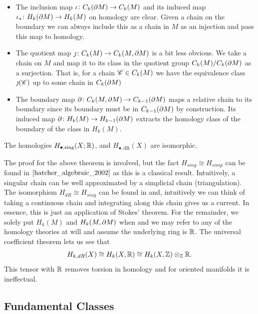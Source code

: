 \documentclass{article}
\begin{document}
\begin{itemize}
    \item The inclusion map $\iota \colon C_k({\partial M}) \to C_k(M)$ and its induced map $\iota_* \colon H_k({\partial M}) \to H_k(M)$ on homology are clear. Given a chain on the boundary we can always include this as a chain in $M$ as an injection and pass this map to homology.
    \item The quotient map $\jmath \colon C_k(M) \to C_k(M,{\partial M})$ is a bit less obvious. We take a chain on $M$ and map it to its class in the quotient group $C_k(M)/C_k({\partial M})$ as a surjection. That is, for a chain $\mathscr{C} \in C_k(M)$ we have the equivalence class $\jmath (\mathscr{C})$ up to some chain in $C_k({\partial M})$
    \item The boundary map $\partial \colon C_k(M,{\partial M}) \to C_{k-1}({\partial M})$ maps a relative chain to its boundary since its boundary must be in $C_{k-1}({\partial M})$ by construction. Its induced map $\partial \colon H_k(M) \to H_{k-1}({\partial M})$ extracts the homology class of the boundary of the class in $H_k(M)$.
\end{itemize}

\begin{theorem}
The homologies $H_{\bullet,\textrm{sing}}(X;\mathbb{R})$, and $H_{\bullet,\textrm{dR}}(X)$ are isomorphic.
\end{theorem}

The proof for the above theorem is involved, but the fact $H_{sing}\cong H_{simp}$ can be found in $\cite{hatcher_algebraic_2002}$ as this is a classical result. Intuitively, a singular chain can be well approximated by a simplicial chain (triangulation). The isomorphism $H_{dR}\cong H_{sing}$ can be found in \cite{giaquinta_cartesian_1998} and, intuitively we can think of taking a continuous chain and integrating along this chain gives us a current. In essence, this is just an application of Stokes' theorem. For the remainder, we solely put $H_k(M)$ and $H_k(M,{\partial M})$ when and we may refer to any of the homology theories at will and assume the underlying ring is $\mathbb{R}$. The universal coefficient theorem lets us see that
\begin{equation}
    H_{k,dR}(X) \cong H_k(X,\mathbb{R}) \cong H_k(X,\mathbb{Z}) \otimes_{\mathbb{Z}} \mathbb{R}.
\end{equation}
This tensor with $\mathbb{R}$ removes torsion in homology and for oriented manifolds it is ineffectual. 

\subsection{Fundamental Classes}
\end{document}
